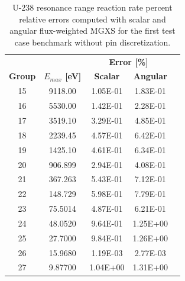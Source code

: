 \begin{table}[h!]
  \centering
  \caption{U-238 resonance range reaction rate percent relative errors computed with scalar and angular flux-weighted MGXS for the first test case benchmark without pin discretization. }
  \label{tab:angular-mgxs-1}
  \begin{tabular}{c c c c c}
  \toprule
  & & \multicolumn{2}{c}{\textbf{Error [\%]}} \\
  \cline{3-4}
  \textbf{Group} & \textbf{\boldmath$E_{max}$ [eV]} & \textbf{Scalar} & \textbf{Angular} \\
  \midrule
  15 & 9118.00 & 1.05E-01 & 1.83E-01 \\
  16 & 5530.00 & 1.42E-01 & 2.28E-01 \\
  17 & 3519.10 & 3.29E-01 & 4.85E-01 \\
  18 & 2239.45 & 4.57E-01 & 6.42E-01 \\
  19 & 1425.10 & 4.61E-01 & 6.34E-01 \\
  20 & 906.899 & 2.94E-01 & 4.08E-01 \\
  21 & 367.263 & 5.43E-01 & 7.12E-01 \\
  22 & 148.729 & 5.98E-01 & 7.79E-01 \\
  23 & 75.5014 & 4.87E-01 & 6.21E-01 \\
  24 & 48.0520 & 9.64E-01 & 1.25E+00 \\
  25 & 27.7000 & 9.84E-01 & 1.26E+00 \\
  26 & 15.9680 & 1.19E-03 & 2.77E-03 \\
  27 & 9.87700 & 1.04E+00 & 1.31E+00 \\
  \bottomrule
\end{tabular}
\end{table}

